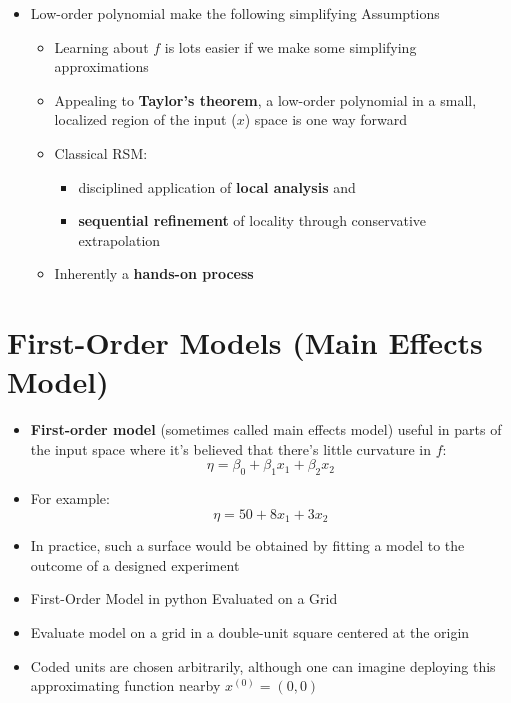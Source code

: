 \documentclass[
  letterpaper,
  DIV=11,
  numbers=noendperiod]{scrreprt}
\providecommand{\tightlist}{%
  \setlength{\itemsep}{0pt}\setlength{\parskip}{0pt}}\usepackage{longtable,booktabs,array}
\begin{document}
\begin{itemize}
\tightlist
\item
  Low-order polynomial make the following simplifying Assumptions

  \begin{itemize}
  \tightlist
  \item
    Learning about \(f\) is lots easier if we make some simplifying
    approximations
  \item
    Appealing to \textbf{Taylor's theorem}, a low-order polynomial in a
    small, localized region of the input (\(x\)) space is one way
    forward
  \item
    Classical RSM:

    \begin{itemize}
    \tightlist
    \item
      disciplined application of \textbf{local analysis} and
    \item
      \textbf{sequential refinement} of locality through conservative
      extrapolation
    \end{itemize}
  \item
    Inherently a \textbf{hands-on process}
  \end{itemize}
\end{itemize}

\hypertarget{first-order-models-main-effects-model}{%
\section{First-Order Models (Main Effects
Model)}\label{first-order-models-main-effects-model}}

\begin{itemize}
\tightlist
\item
  \textbf{First-order model} (sometimes called main effects model)
  useful in parts of the input space where it's believed that there's
  little curvature in \(f\):
  \[\eta = \beta_0 + \beta_1 x_1 + \beta_2 x_2 \]
\item
  For example: \[\eta = 50 + 8 x_1 + 3x_2\]
\item
  In practice, such a surface would be obtained by fitting a model to
  the outcome of a designed experiment
\item
  First-Order Model in python Evaluated on a Grid
\item
  Evaluate model on a grid in a double-unit square centered at the
  origin
\item
  Coded units are chosen arbitrarily, although one can imagine deploying
  this approximating function nearby \(x^{(0)} = (0,0)\)
\end{itemize}
\end{document}
